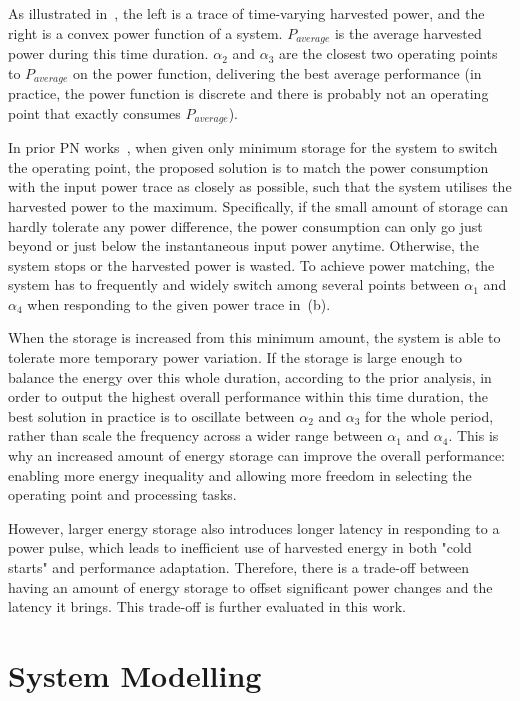 As illustrated in~, the left is a trace of time-varying harvested power, and the right is a convex power function of a system. $P_{average}$ is the average harvested power during this time duration. $\alpha_2$ and $\alpha_3$ are the closest two operating points to $P_{average}$ on the power function, delivering the best average performance (in practice, the power function is discrete and there is probably not an operating point that exactly consumes $P_{average}$).

In prior PN works~\cite{balsamo2016graceful, fletcher2017power}, when given only minimum storage for the system to switch the operating point, the proposed solution is to match the power consumption with the input power trace as closely as possible, such that the system utilises the harvested power to the maximum. Specifically, if the small amount of storage can hardly tolerate any power difference, the power consumption can only go just beyond or just below the instantaneous input power anytime. Otherwise, the system stops or the harvested power is wasted. To achieve power matching, the system has to frequently and widely switch among several points between $\alpha_1$ and $\alpha_4$ when responding to the given power trace in~(b).

When the storage is increased from this minimum amount, the system is able to tolerate more temporary power variation. If the storage is large enough to balance the energy over this whole duration, according to the prior analysis, in order to output the highest overall performance within this time duration, the best solution in practice is to oscillate between $\alpha_2$ and $\alpha_3$ for the whole period, rather than scale the frequency across a wider range between $\alpha_1$ and $\alpha_4$. This is why an increased amount of energy storage can improve the overall performance: enabling more energy inequality and allowing more freedom in selecting the operating point and processing tasks. 

However, larger energy storage also introduces longer latency in responding to a power pulse, which leads to inefficient use of harvested energy in both "cold starts" and performance adaptation. Therefore, there is a trade-off between having an amount of energy storage to offset significant power changes and the latency it brings. This trade-off is further evaluated in this work.

\section{System Modelling}

